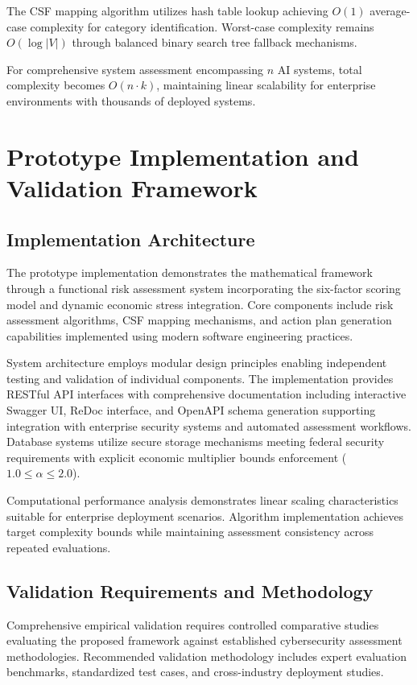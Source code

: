 \documentclass[11pt,letterpaper]{article}
\begin{document}
The CSF mapping algorithm utilizes hash table lookup achieving $O(1)$ average-case complexity for category identification. Worst-case complexity remains $O(\log |V|)$ through balanced binary search tree fallback mechanisms.

For comprehensive system assessment encompassing $n$ AI systems, total complexity becomes $O(n \cdot k)$, maintaining linear scalability for enterprise environments with thousands of deployed systems.

\section{Prototype Implementation and Validation Framework}

\subsection{Implementation Architecture}

The prototype implementation demonstrates the mathematical framework through a functional risk assessment system incorporating the six-factor scoring model and dynamic economic stress integration. Core components include risk assessment algorithms, CSF mapping mechanisms, and action plan generation capabilities implemented using modern software engineering practices.

System architecture employs modular design principles enabling independent testing and validation of individual components. The implementation provides RESTful API interfaces with comprehensive documentation including interactive Swagger UI, ReDoc interface, and OpenAPI schema generation supporting integration with enterprise security systems and automated assessment workflows. Database systems utilize secure storage mechanisms meeting federal security requirements with explicit economic multiplier bounds enforcement ($1.0 \leq \alpha \leq 2.0$).

Computational performance analysis demonstrates linear scaling characteristics suitable for enterprise deployment scenarios. Algorithm implementation achieves target complexity bounds while maintaining assessment consistency across repeated evaluations.

\subsection{Validation Requirements and Methodology}

Comprehensive empirical validation requires controlled comparative studies evaluating the proposed framework against established cybersecurity assessment methodologies. Recommended validation methodology includes expert evaluation benchmarks, standardized test cases, and cross-industry deployment studies.
\end{document}
